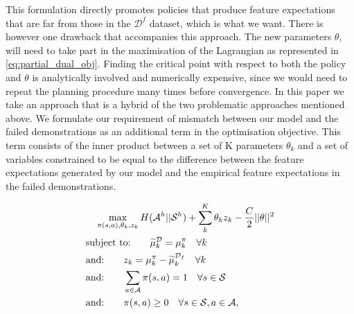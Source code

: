\documentclass[letterpaper]{article}
\begin{document}
	This formulation directly promotes policies that produce feature expectations that are far from those in the $\mathcal{D}^f$ dataset, which is what we want. There is however one drawback that accompanies this approach. The new parameters $\theta$, will need to take part in the maximisation of the Lagrangian as represented in \eqref{eq:partial_dual_obj}. Finding the critical point with respect to both the policy and $\theta$ is analytically involved and numerically expensive, since we would need to repeat the planning procedure many times before convergence. 
	In this paper we take an approach that is a hybrid of the two problematic approaches mentioned above. We formulate our requirement of mismatch between our model and the failed demonstrations as an additional term in the optimisation objective. This term consists of the inner product between a set of K parameters $\theta_k$ and a set of variables constrained to be equal to the difference between the feature expectations generated by our model and the empirical feature expectations in the failed demonstrations. 


\begin{align}
 &\quad\max\limits_{\pi(s,a),\theta_k,z_k} H(\mathcal{A}^h||\mathcal{S}^h) + \sum_k^K \theta_k z_k - \frac{C}{2}||\mathbf{\theta}||^2 \label{eq:primal_obj_failure}\\
&\hbox{subject to:}\quad \quad\widetilde{\mu}^{\mathcal{D}}_k   = \mu^{\pi}_k\quad\forall k \label{eq:features_equality_constraint_failure}\\
&\hbox{and:}\quad \quad z_k = \mu_k^{\pi} -\widetilde{\mu}_k^{\mathcal{D}_f} \quad \forall k\\
&\hbox{and:} \quad \quad\sum_{a\in\mathcal{A}}\pi(s,a)  = 1\quad\forall s\in\mathcal{S}\\
&\hbox{and:} \quad \quad\pi(s,a) \geq 0\quad\forall s\in\mathcal{S},a\in\mathcal{A},  
\end{align}
\end{document}
